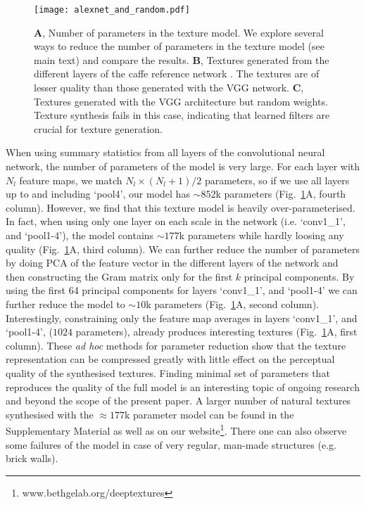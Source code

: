 \documentclass{article} %
\begin{document}
\begin{figure}[]
\begin{center}
\texttt{[image: alexnet\_and\_random.pdf]}%
\end{center}
\caption{\label{alexnet_and_random}\textbf{A}, Number of parameters in the texture model. We explore several ways to reduce the number of parameters in the texture model (see main text) and compare the results. \textbf{B}, Textures generated from the different layers of the caffe reference network \cite{jia_caffe:_2014,krizhevsky_imagenet_2012}. The textures are of lesser quality than those generated with the VGG network. \textbf{C}, Textures generated with the VGG architecture but random weights. Texture synthesis fails in this case, indicating that learned filters are crucial for texture generation.}
\end{figure}

When using summary statistics from all layers of the convolutional neural network, the number of parameters of the model is very large. For each layer with $N_l$ feature maps, we match $N_l\times(N_l + 1)/2$ parameters, so if we use all layers up to and including `pool4', our model has $\sim 852$k parameters (Fig.~\ref{alexnet_and_random}A, fourth column). However, we find that this texture model is heavily over-parameterised. In fact, when using only one layer on each scale in the network (i.e. `conv1\_1', and `pool1-4'), the model contains $\sim 177$k parameters while hardly loosing any quality (Fig.~\ref{alexnet_and_random}A, third column). We can further reduce the number of parameters by doing PCA of the feature vector in the different layers of the network and then constructing the Gram matrix only for the first $k$ principal components. By using the first 64 principal components for layers `conv1\_1', and `pool1-4' we can further reduce the model to $\sim 10$k parameters (Fig.~\ref{alexnet_and_random}A, second column). Interestingly, constraining only the feature map averages in layers `conv1\_1', and `pool1-4',  ($1024$ parameters), already produces interesting textures (Fig.~\ref{alexnet_and_random}A, first column). These \emph{ad hoc} methods for parameter reduction show that the texture representation can be compressed greatly with little effect on the perceptual quality of the synthesised textures. Finding minimal set of parameters that reproduces the quality of the full model is an interesting topic of ongoing research and beyond the scope of the present paper. A larger number of natural textures synthesised with the $\approx 177$k parameter model can be found in the Supplementary Material as well as on our website\footnote{www.bethgelab.org/deeptextures}. There one can also observe some failures of the model in case of very regular, man-made structures (e.g. brick walls).
\end{document}
